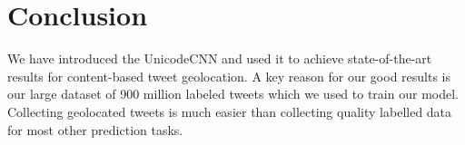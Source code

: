 \documentclass[sigconf,anonymous,review]{acmart}
\newcommand{\ignore}[1]{}
\newcommand{\uniloc}{\textsc{UniLoc}}
\begin{document}
\section{Conclusion}

We have introduced the UnicodeCNN and used it to achieve state-of-the-art results for content-based tweet geolocation.
A key reason for our good results is our large dataset of 900 million labeled tweets which we used to train our model.
Collecting geolocated tweets is much easier than collecting quality labelled data for most other prediction tasks.

\ignore{
\section{Visualization}

A major disadvantage of CNNs is that they lack interpretability compared to simpler models.
To alleviate this problem, many techniques have been proposed to visualize CNNs in the context of image classification \citep{zeiler2014visualizing,seifert2017visualizations}.
We adapt these methods to provide the first visualization method of CNNs applicable to the text domain.
This visualization technique helps us understand the dialectical patterns that \uniloc~CNN discovers in the text.

The method is simple and inspired by the occlusion method proposed by \citet{zeiler2014visualizing} for visualizing image CNNs.
Given an input text with $n$ characters,
we generate $n-1$ new texts by removing the $i$th character from the original text.
}

\end{document}
